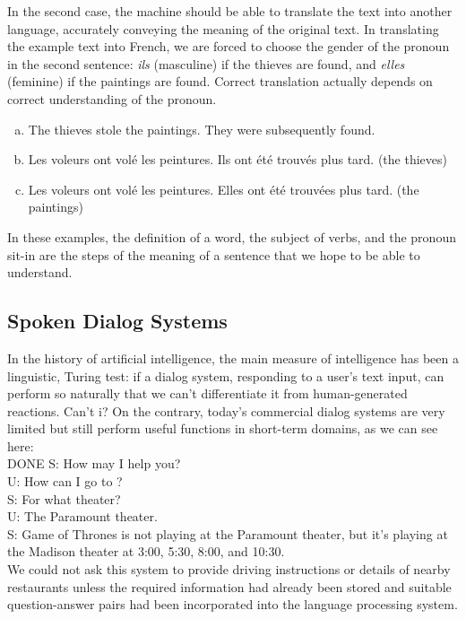 In the second case, the machine should be able to translate the text into another language, accurately conveying the meaning of the original text. In translating the example text into French, we are forced to choose the gender of the pronoun in the second sentence: \emph{ils} (masculine) if the thieves are found, and \emph{elles} (feminine) if the paintings are found. Correct translation actually depends on correct understanding of the pronoun.
\begin{enumerate}[a.]
    \item The thieves stole the paintings. They were subsequently found.
    \item Les voleurs ont volé les peintures. Ils ont été trouvés plus tard. (the thieves)
    \item Les voleurs ont volé les peintures. Elles ont été trouvées plus tard. (the paintings)
\end{enumerate}
In these examples, the definition of a word, the subject of verbs, and the pronoun sit-in are the steps of the meaning of a sentence that we hope to be able to understand.

\subsection{Spoken Dialog Systems}
In the history of artificial intelligence, the main measure of intelligence has been a linguistic, Turing test: if a dialog system, responding to a user's text input, can perform so naturally that we can't differentiate it from human-generated reactions. Can't i? On the contrary, today's commercial dialog systems are very limited but still perform useful functions in short-term domains, as we can see here:\\
DONE
S: How may I help you?\\
U: How can I go to ?\\
S: For what theater?\\
U: The Paramount theater.\\
S: Game of Thrones is not playing at the Paramount theater, but
it's playing at the Madison theater at 3:00, 5:30, 8:00, and 10:30.\\

We could not ask this system to provide driving instructions or details of nearby restaurants unless the required information had already been stored and suitable question-answer pairs had been incorporated into the language processing system.

